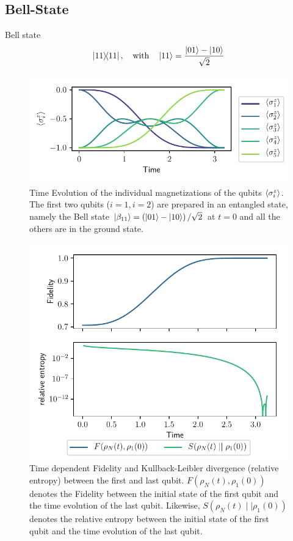 \documentclass{book}
\numberwithin{equation}{section} %
\begin{document}
\subsection{Bell-State}
Bell state \cite{BA_HS_nielsenchuang}
\begin{align}
    \dyad{11}, \qq{with} \ket{11} = \frac{\ket{01}-\ket{10}}{\sqrt{2}}
\end{align}
\begin{figure}[H]
    \centering
    \includegraphics{alltheplots/bell/expval_z.pdf}
    \caption{Time Evolution of the individual magnetizations of the qubits
    $\expval{\sigma^z_i}$.
    The first two qubits ($i=1, i=2$) are prepared in an entangled state, namely the Bell state $\ket{\beta_{11}} = \left(\ket{01}-\ket{10}\right)/\sqrt{2}$
    at $t=0$ and all the others
    are in the ground state.}
    \label{fig:bell_expval_z}
\end{figure}
\begin{figure}[H]
    \centering
    \includegraphics{alltheplots/bell/fidelity_dkl.pdf}
    \caption{Time dependent Fidelity and Kullback-Leibler divergence (relative entropy) between the first and last qubit.
    $F(\rho_N(t), \rho_1(0))$ denotes the Fidelity between the initial state of the first qubit and the time evolution of the last qubit.
    Likewise, $S(\rho_N(t)\mid\mid\rho_1(0))$ denotes the relative entropy between the initial state of the first qubit and the time evolution of the last qubit.}
    \label{fig:bell_fide_dkl}
\end{figure}
\end{document}
